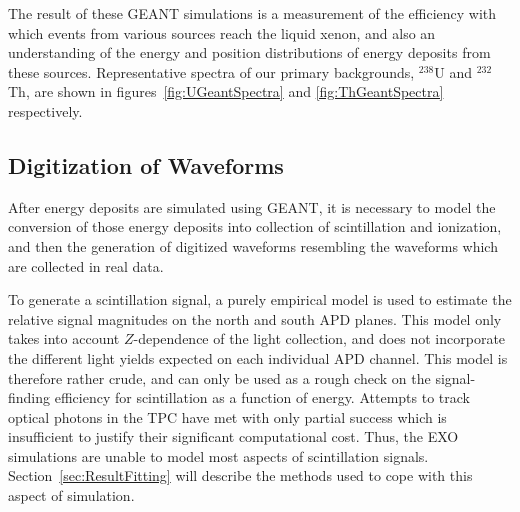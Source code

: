 The result of these GEANT simulations is a measurement of the efficiency with which events from various sources reach the liquid xenon, and also an understanding of the energy and position distributions of energy deposits from these sources.  Representative spectra of our primary backgrounds, $^{238}$U and $^{232}$Th, are shown in figures~\ref{fig:UGeantSpectra} and \ref{fig:ThGeantSpectra} respectively.

\subsection{Digitization of Waveforms}\label{sec:ResultsDigitization}

After energy deposits are simulated using GEANT, it is necessary to model the conversion of those energy deposits into collection of scintillation and ionization, and then the generation of digitized waveforms resembling the waveforms which are collected in real data.

To generate a scintillation signal, a purely empirical model is used to estimate the relative signal magnitudes on the north and south APD planes.  This model only takes into account $Z$-dependence of the light collection, and does not incorporate the different light yields expected on each individual APD channel.  This model is therefore rather crude, and can only be used as a rough check on the signal-finding efficiency for scintillation as a function of energy.  Attempts to track optical photons in the TPC have met with only partial success which is insufficient to justify their significant computational cost.  Thus, the EXO simulations are unable to model most aspects of scintillation signals.  Section~\ref{sec:ResultFitting} will describe the methods used to cope with this aspect of simulation.

